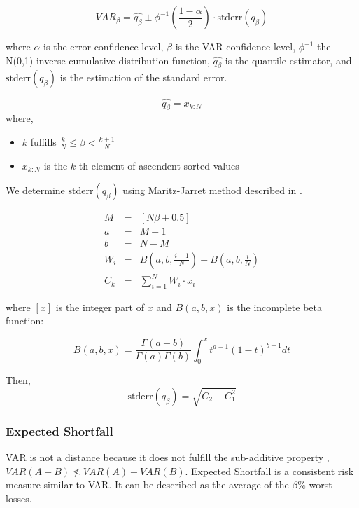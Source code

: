\documentclass[a4paper,12pt,final]{article}
\begin{document}
\begin{displaymath}
VAR_{\beta} = \widehat{q_{\beta}} \pm \phi^{-1}\left(\frac{1-\alpha}{2}\right) \cdot \textrm{stderr}(q_{\beta})
\end{displaymath}

where $\alpha$ is the error confidence level, $\beta$ is the VAR confidence 
level, $\phi^{-1}$ the N(0,1) inverse cumulative distribution function, 
$\widehat{q_{\beta}}$ is the quantile estimator, and $\textrm{stderr}(q_{\beta})$
is the estimation of the standard error.

\begin{displaymath}
\widehat{q_{\beta}} = x_{k:N}
\end{displaymath}
where,
\begin{itemize}
\item $k$ fulfills $\frac{k}{N} \leq \beta < \frac{k+1}{N}$
\item $x_{k:N}$ is the $k$-th element of ascendent sorted values
\end{itemize}

We determine $\textrm{stderr}(q_{\beta})$ using Maritz-Jarret method described
in \cite{quant:algor}.

\begin{eqnarray}
M   & = & [N \beta + 0.5] \nonumber \\
a   & = & M - 1 \nonumber \\
b   & = & N - M \nonumber \\
W_i & = & B(a,b,\frac{i+1}{N}) - B(a,b,\frac{i}{N}) \nonumber \\
C_k & = & \sum_{i=1}^{N} W_i \cdot x_i \nonumber
\end{eqnarray}

where $[x]$ is the integer part of $x$ and $B(a,b,x)$ is the incomplete beta 
function:

\begin{displaymath}
B(a,b,x)=\frac{\Gamma(a+b)}{\Gamma(a)\Gamma(b)}\int_0^x t^{a-1} (1-t)^{b-1} dt
\end{displaymath}

Then,
\begin{displaymath}
\textrm{stderr}(q_{\beta}) = \sqrt{C_2 - C_1^2}
\end{displaymath}

\subsubsection{Expected Shortfall}
VAR is not a distance because it does not fulfill the sub-additive property 
\cite{var:varbad}, $VAR(A+B) \nleq VAR(A)+VAR(B)$. Expected Shortfall is a 
consistent risk measure \cite{var:eshortfall} similar to VAR. It can be described
as the average of the $\beta\%$ worst losses.
\end{document}
